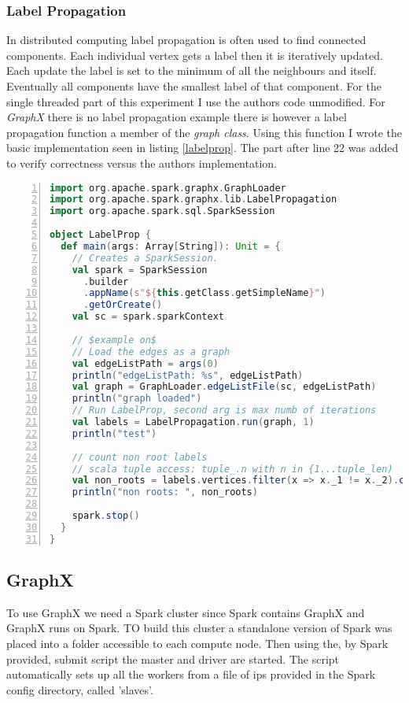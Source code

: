 \subsubsection{Label Propagation}
In distributed computing label propagation is often used to find connected components. Each individual vertex gets a label then it is iteratively updated. Each update the label is set to the minimum of all the neighbours and itself. Eventually all components have the smallest label of that component. For the single threaded part of this experiment I use the authors code unmodified. For \textit{GraphX} there is no label propagation example there is however a label propagation function a member of the \textit{graph class}. Using this function I wrote the basic implementation seen in listing \ref{labelprop}. The part after line 22 was added to verify correctness versus the authors implementation.

\begin{lstlisting}[caption={Scala Label Propagation for spark},language=Scala,numbers=left,breaklines=true, label={labelprop}]
import org.apache.spark.graphx.GraphLoader
import org.apache.spark.graphx.lib.LabelPropagation
import org.apache.spark.sql.SparkSession

object LabelProp {
  def main(args: Array[String]): Unit = {
    // Creates a SparkSession.
    val spark = SparkSession
      .builder
      .appName(s"${this.getClass.getSimpleName}")
      .getOrCreate()
    val sc = spark.sparkContext

    // $example on$
    // Load the edges as a graph
    val edgeListPath = args(0)
    println("edgeListPath: %s", edgeListPath)
    val graph = GraphLoader.edgeListFile(sc, edgeListPath)
    println("graph loaded")
    // Run LabelProp, second arg is max numb of iterations
    val labels = LabelPropagation.run(graph, 1)
    println("test")

    // count non root labels
    // scala tuple access: tuple_.n with n in {1...tuple_len)
    val non_roots = labels.vertices.filter(x => x._1 != x._2).count()
    println("non roots: ", non_roots)

    spark.stop()
  }
}
\end{lstlisting}

\subsection{GraphX}
To use GraphX we need a Spark cluster since Spark contains GraphX and GraphX runs on Spark. TO build this cluster a standalone version of Spark was placed into a folder accessible to each compute node. Then using the, by Spark provided, submit script the master and driver are started. The script automatically sets up all the workers from a file of ips provided in the Spark config directory, called 'slaves'.

